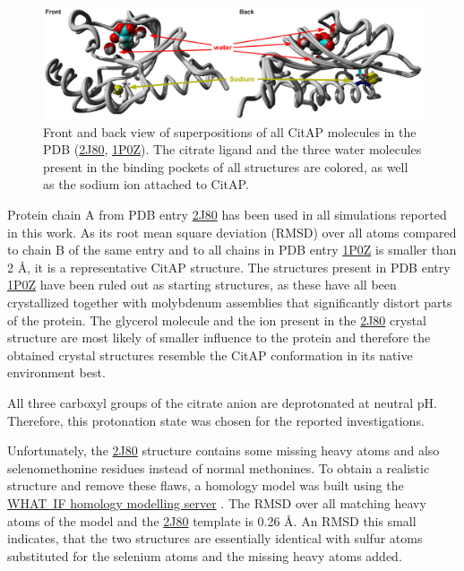 \documentclass[english, a4paper, 12pt, titlepage, draft]{article}
\newcommand{\PDB}[1]{\href{http://pdb.rcsb.org/pdb/explore/explore.do?structureId=#1}{#1}}
\begin{document}
\begin{figure}
    \centering
    \includegraphics[width=1.0\textwidth]{figures/CitAP_PDB_structures/CitAP_PDB_structures.pdf}
    \caption{Front and back view of superpositions of all CitAP molecules in the PDB (\PDB{2J80}, \PDB{1P0Z}). The citrate ligand and the three water molecules present in the binding pockets of all structures are colored, as well as the sodium ion attached to CitAP.}
    \label{fig:CitAP_waterNA}
\end{figure}       

Protein chain A from PDB entry \PDB{2J80} has been used in all simulations reported in this work.
As its root mean square deviation (RMSD) over all  atoms compared to chain B of the same entry and to all chains in PDB entry \PDB{1P0Z} is smaller than 2 \r{A}, it is a representative CitAP structure.
The structures present in PDB entry \PDB{1P0Z} have been ruled out as starting structures, as these have all been crystallized together with molybdenum assemblies that significantly distort parts of the protein.
The glycerol molecule and the  ion present in the \PDB{2J80} crystal structure are most likely of smaller influence to the protein and therefore the obtained crystal structures resemble the CitAP conformation in its native environment best.

All three carboxyl groups of the citrate anion are deprotonated at neutral pH.
Therefore, this protonation state was chosen for the reported investigations.

Unfortunately, the \PDB{2J80} structure contains some missing heavy atoms and also selenomethonine residues instead of normal methonines.
To obtain a realistic structure and remove these flaws, a homology model was built using the \href{http://swift.cmbi.ru.nl/servers/html/index.html}{WHAT~IF homology modelling server} \cite{WHATIFhomologyModel}.
The RMSD over all matching heavy atoms of the model and the \PDB{2J80} template is 0.26 \r{A}.
An RMSD this small indicates, that the two structures are essentially identical with sulfur atoms substituted for the selenium atoms and the missing heavy atoms added.
\end{document}
